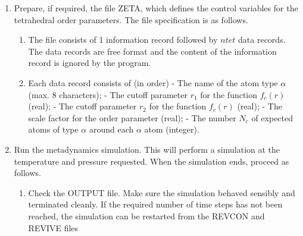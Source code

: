 \begin{enumerate}
\begin{enumerate}
  (in order)\newline
  - The name of the atom type $\alpha$ (max. 8 characters); \newline
  - The name of the atom type $\beta$ (max. 8 characters); \newline
  - The control parameter $r_{1}$ for the function $f_{c}(r)$ in
    equation (\ref{stein3}) (real); \newline
  - The control parameter $r_{2}$ for the function $f_{c}(r)$ in
    equation (\ref{stein3}) (real); \newline
  - The scale factor for the order parameter (real); \newline
  - The number $N_{c}$ of expected atoms of type $\beta$ around the $\alpha$
  atom (integer). 
\end{enumerate}
\item Prepare, if required, the file ZETA, which defines the 
  control variables for the tetrahedral order parameters. The file 
  specification is as follows. 
\begin{enumerate}
\item The file consists of 1 information record followed by $ntet$ data 
  records. The data records are free format and the content of the information
  record is ignored by the program.
\item Each data record consists of (in order)\newline
  - The name of the atom type $\alpha$ (max. 8 characters); \newline
  - The cutoff parameter $r_{1}$ for the function $f_{c}(r)$ (real); \newline
  - The cutoff parameter $r_{2}$ for the function $f_{c}(r)$ (real); \newline
  - The scale factor for the order parameter (real); \newline
  - The number $N_{c}$ of expected atoms of type $\alpha$ around each
    $\alpha$ atom (integer). 
\end{enumerate}
\item Run the metadynamics simulation. This will perform a simulation at the
   temperature and pressure requested. When the simulation ends, proceed 
   as follows.
\begin{enumerate}
\item Check the OUTPUT file. Make sure the simulation behaved sensibly and
  terminated cleanly. If the required number of time steps has not been 
  reached, the simulation can be restarted from the REVCON and REVIVE files

\end{enumerate}
\end{enumerate}
